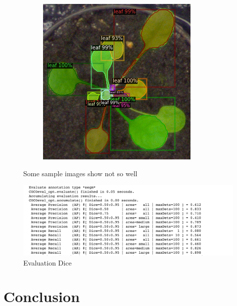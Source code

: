 \documentclass[conference]{IEEEtran}
\begin{document}
\begin{figure}[h!]
\begin{subfigure}[h!]{0.24\textwidth}
\end{subfigure}
\hfill
\begin{subfigure}[h!]{0.24\textwidth}
    \centering
    \includegraphics[width=\textwidth]{img/ara2013_plant162.png}
\end{subfigure}
\caption{Some sample images show not so well}
\label{fig:bad_result}
\end{figure}

\begin{figure}[h]
    \centering
    \includegraphics[width=\linewidth]{img/dice_evl.png}
    \caption{Evaluation Dice}
    \label{fig_ap}
\end{figure}


\section{Conclusion}
\end{document}
